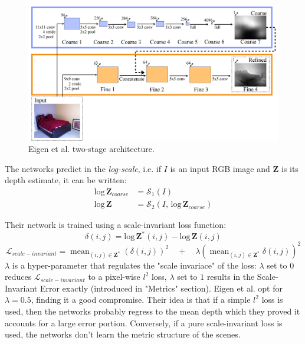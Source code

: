 \begin{figure}
\centering
\includegraphics[width=1.\textwidth]{figs/Eigen}
\caption{Eigen et al. \cite{Eigen} two-stage architecture. \label{fig:Eigen}}
\end{figure}

The networks predict in the \textit{log-scale}, i.e. if $I$ is an input RGB image and $\mathbf{Z}$ is its depth estimate, it can be written:
\begin{equation}
	\begin{split}
	\text{log} \, \mathbf{Z}_{coarse} & = \mathcal{S}_{1}(I) \\
	\text{log} \, \mathbf{Z} & = \mathcal{S}_{2}(I, \, \text{log} \, \mathbf{Z}_{coarse})
	\end{split}
\end{equation}

Their network is trained using a scale-invariant loss function:
\[
	\delta(i, j) = \text{log} \, \mathbf{Z}^{*} (i, j) - \text{log} \, \mathbf{Z} (i, j)
\]\[
	\mathcal{L}_{scale-invariant} =
	\mathop{\text{mean}}_{(i, j) \in \mathbf{Z}^{*}} \left( \delta(i, j) \right)^{2} \quad +\quad
	\lambda \left( \mathop{\text{mean}}_{(i, j) \in \mathbf{Z}^{*}} \delta(i, j) \right) ^{2}
\]
$\lambda$ is a hyper-parameter that regulates the "scale invariace" of the loss: $\lambda$ set to $0$ reduces $\mathcal{L}_{scale-invariant}$ to a pixel-wise $l^{2}$ loss, $\lambda$ set to $1$ results in the Scale-Invariant Error exactly (introduced in "Metrics" section).
Eigen et al. opt for $\lambda = 0.5$, finding it a good compromise.
Their idea is that if a simple $l^{2}$ loss is used, then the networks probably regress to the mean depth which they proved it accounts for a large error portion.
Conversely, if a pure scale-invariant loss is used, the networks don't learn the metric structure of the scenes.

